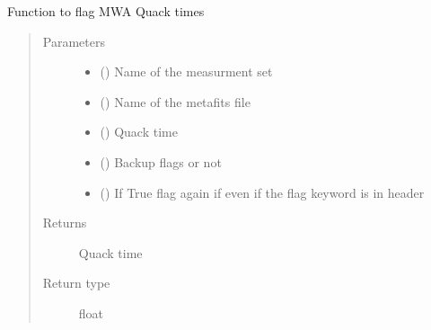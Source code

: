 \documentclass[letterpaper,10pt,english]{sphinxmanual}
\begin{document}

\begin{fulllineitems}
\label{\detokenize{paircars:paircars.flagger.flag_MWA_quack}}
\sphinxAtStartPar
Function to flag MWA Quack times
\begin{quote}\begin{description}
\item[{Parameters}] \leavevmode\begin{itemize}
\item {} 
\sphinxAtStartPar
{} () \textendash{} Name of the measurment set

\item {} 
\sphinxAtStartPar
{} () \textendash{} Name of the metafits file

\item {} 
\sphinxAtStartPar
{} () \textendash{} Quack time

\item {} 
\sphinxAtStartPar
{} () \textendash{} Backup flags or not

\item {} 
\sphinxAtStartPar
{} () \textendash{} If True flag again if even if the flag keyword is in header

\end{itemize}

\item[{Returns}] \leavevmode
\sphinxAtStartPar
Quack time

\item[{Return type}] \leavevmode
\sphinxAtStartPar
float

\end{description}\end{quote}

\end{fulllineitems}
\end{document}
